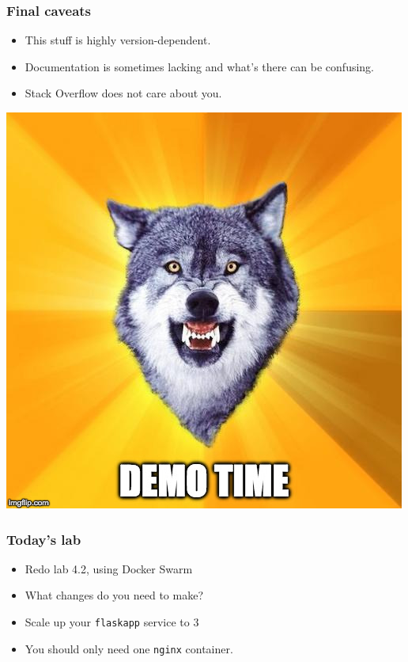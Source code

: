 \documentclass[10pt]{beamer}
\begin{document}
 \begin{frame}
  \frametitle{Final caveats}
   
   \begin{itemize}
     \item This stuff is highly version-dependent.
     \item Documentation is sometimes lacking and what's there can be confusing.
     \item Stack Overflow does not care about you.
   \end{itemize}
\end{frame}    

\begin{frame}
    \begin{center}
     \includegraphics[scale=0.4]{demo}
     \end{center}
\end{frame}
 
 \begin{frame}
  \frametitle{Today's lab}
   
   \begin{itemize}
     \item Redo lab 4.2, using Docker Swarm
     \item What changes do you need to make?
     \item Scale up your \texttt{flaskapp} service to 3
     \item You should only need one \texttt{nginx} container.
   \end{itemize}
\end{frame}
\end{document}

